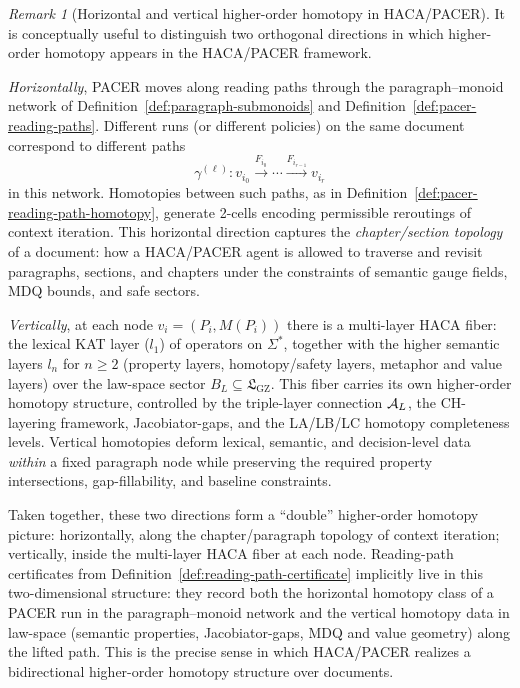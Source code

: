 \documentclass[11pt]{book}
\theoremstyle{plain}
\theoremstyle{definition}
\theoremstyle{remark}
\newtheorem{remark}[theorem]{Remark}
\newcommand{\GZLS}{\ensuremath{\mathfrak{L}_{\mathrm{GZ}}}}       \newcommand{\GZLT}{\ensuremath{M_{!w}}}                           \newcommand{\GZLOC}{\ensuremath{A_M}}                             \newcommand{\GZLC}{\ensuremath{\omega_{\mathrm{law}}}}            \newcommand{\GZLCurv}{\ensuremath{\mathcal{F}_{\mathrm{law}}}}
\begin{document}
\begin{remark}[Horizontal and vertical higher-order homotopy in HACA/PACER]
\label{rem:horizontal-vertical-homotopy}
It is conceptually useful to distinguish two orthogonal directions in
which higher-order homotopy appears in the HACA/PACER framework.

\emph{Horizontally}, PACER moves along reading paths through the
paragraph--monoid network of
Definition~\ref{def:paragraph-submonoids} and
Definition~\ref{def:pacer-reading-paths}. Different runs (or different
policies) on the same document correspond to different paths
\[
  \gamma^{(\ell)}:
    v_{i_0}\xrightarrow{F_{i_0}}\cdots\xrightarrow{F_{i_{r-1}}}v_{i_r}
\]
in this network. Homotopies between such paths, as in
Definition~\ref{def:pacer-reading-path-homotopy}, generate 2-cells
encoding permissible reroutings of context iteration. This horizontal
direction captures the \emph{chapter/section topology} of a document:
how a HACA/PACER agent is allowed to traverse and revisit paragraphs,
sections, and chapters under the constraints of semantic gauge fields,
MDQ bounds, and safe sectors.

\emph{Vertically}, at each node $v_i=(P_i,M(P_i))$ there is a
multi-layer HACA fiber: the lexical KAT layer ($l_1$) of operators on
$\Sigma^*$, together with the higher semantic layers $l_n$ for $n\ge 2$
(property layers, homotopy/safety layers, metaphor and value layers)
over the law-space sector $B_L\subseteq\GZLS$. This fiber carries its
own higher-order homotopy structure, controlled by the triple-layer
connection $\mathcal{A}_L$, the CH-layering framework, Jacobiator-gaps, and
the LA/LB/LC homotopy completeness levels. Vertical homotopies deform
lexical, semantic, and decision-level data \emph{within} a fixed
paragraph node while preserving the required property intersections,
gap-fillability, and baseline constraints.

Taken together, these two directions form a ``double'' higher-order
homotopy picture: horizontally, along the chapter/paragraph topology
of context iteration; vertically, inside the multi-layer HACA fiber at
each node. Reading-path certificates from
Definition~\ref{def:reading-path-certificate} implicitly live in this
two-dimensional structure: they record both the horizontal homotopy
class of a PACER run in the paragraph--monoid network and the vertical
homotopy data in law-space (semantic properties, Jacobiator-gaps, MDQ
and value geometry) along the lifted path. This is the precise sense
in which HACA/PACER realizes a bidirectional higher-order homotopy
structure over documents.
\end{remark}
\end{document}
